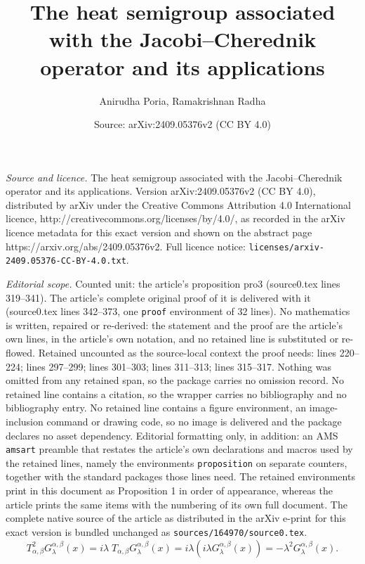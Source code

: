 \documentclass[10pt,a4paper]{amsart}
\title{The heat semigroup associated with the Jacobi--Cherednik operator and its applications}
\author{Anirudha Poria, Ramakrishnan Radha}
\date{Source: arXiv:2409.05376v2 (CC BY 4.0)}
\begin{document}
\maketitle

\noindent\emph{Source and licence.} The heat semigroup associated with the Jacobi--Cherednik operator and its applications. Version arXiv:2409.05376v2 (CC BY 4.0), distributed by arXiv under the Creative Commons Attribution 4.0 International licence, http://creativecommons.org/licenses/by/4.0/, as recorded in the arXiv licence metadata for this exact version and shown on the abstract page https://arxiv.org/abs/2409.05376v2. Full licence notice: \texttt{licenses/arxiv-2409.05376-CC-BY-4.0.txt}.\par\smallskip

\noindent\textit{Editorial scope.} Counted unit: the article's proposition pro3 (source0.tex lines 319--341). The article's complete original proof of it is delivered with it (source0.tex lines 342--373, one \texttt{proof} environment of 32 lines). No mathematics is written, repaired or re-derived: the statement and the proof are the article's own lines, in the article's own notation, and no retained line is substituted or re-flowed.  Retained uncounted as the source-local context the proof needs: lines 220--224; lines 297--299; lines 301--303; lines 311--313; lines 315--317.  Nothing was omitted from any retained span, so the package carries no omission record.  No retained line contains a citation, so the wrapper carries no bibliography and no bibliography entry.  No retained line contains a figure environment, an image-inclusion command or drawing code, so no image is delivered and the package declares no asset dependency.  Editorial formatting only, in addition: an AMS \texttt{amsart} preamble that restates the article's own declarations and macros used by the retained lines, namely the environments \texttt{proposition} on separate counters, together with the standard packages those lines need.  The retained environments print in this document as Proposition 1 in order of appearance, whereas the article prints the same items with the numbering of its own full document.  The complete native source of the article as distributed in the arXiv e-print for this exact version is bundled unchanged as \texttt{sources/164970/source0.tex}.
\begin{equation}\label{eq02}
T^2_{\alpha, \beta} G^{\alpha, \beta}_\lambda(x)=i \lambda \; T_{\alpha, \beta} G^{\alpha, \beta}_\lambda(x)
=i \lambda \left( i \lambda G^{\alpha, \beta}_\lambda(x) \right)
=- \lambda^2  G^{\alpha, \beta}_\lambda(x).
\end{equation}
\end{document}
